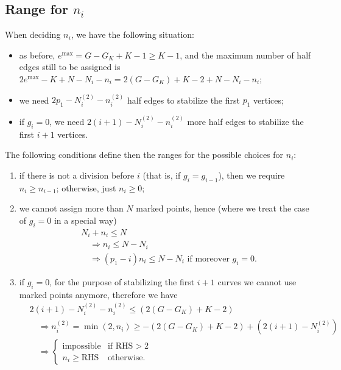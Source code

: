 \documentclass{amsart}
\theoremstyle{plain}
\theoremstyle{definition}
\DeclareMathOperator{\MAX}{max}
\begin{document}
\subsection{Range for $n_i$}

When deciding $n_i$, we have the following situation:
\begin{itemize}
\item as before, $e^{\MAX} = G - G_K + K - 1 \geq K-1$, and the
  maximum number of half edges still to be assigned is $2e^{\MAX} - K
  + N - N_i - n_i = 2(G - G_K) + K - 2 + N - N_i - n_i$;
\item we need $2p_1 - N^{(2)}_i - n^{(2)}_i$ half edges to stabilize
  the first $p_1$ vertices;
\item if $g_i = 0$, we need $2(i+1) - N^{(2)}_i - n^{(2)}_i$ more half
  edges to stabilize the first $i+1$ vertices.
\end{itemize}

The following conditions define then the ranges for the possible
choices for $n_i$:

\begin{enumerate}
\item if there is not a division before $i$ (that is, if $g_i =
  g_{i-1}$), then we require $n_i \geq n_{i-1}$; otherwise, just $n_i
  \geq 0$;
\item we cannot assign more than $N$ marked points, hence (where we
  treat the case of $g_i = 0$ in a special way)
  \begin{align*}
    &N_i + n_i \leq N\\
    &\quad\Rightarrow n_i \leq N - N_i\\
    &\quad\Rightarrow (p_1 - i)n_i \leq N - N_i\text{ if moreover $g_i = 0$.}
  \end{align*}
\item if $g_i = 0$, for the purpose of stabilizing the first $i+1$
  curves we cannot use marked points anymore, therefore we have
  \begin{align*}
    &2 (i+1) - N^{(2)}_i - n^{(2)}_i \leq (2(G - G_K) + K - 2)\\
    &\quad\Rightarrow n^{(2)}_i = \min(2, n_i) \geq - (2(G - G_K) + K - 2) + (2(i+1) - N^{(2)}_i)\\
    &\quad\Rightarrow
    \begin{cases}
      \text{impossible} & \text{if $\mathrm{RHS} > 2$}\\
      n_i \geq \mathrm{RHS} & \text{otherwise.}
    \end{cases}
  \end{align*}
\end{enumerate}
\end{document}

